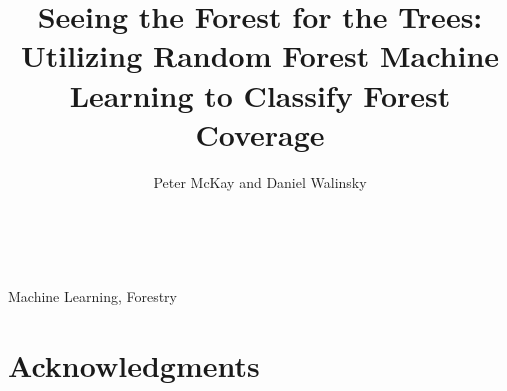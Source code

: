 \documentclass[twoside,letterpaper]{soups}
\begin{document}
%


\title{\Large \bf Seeing the Forest for the Trees: \\
Utilizing Random Forest Machine Learning to Classify Forest Coverage
}
\author{
Peter McKay and Daniel Walinsky\\
\\
\\
}
\maketitle


\begin{keywords} 
Machine Learning, Forestry
\end{keywords}









\section{Acknowledgments}




\end{document}
